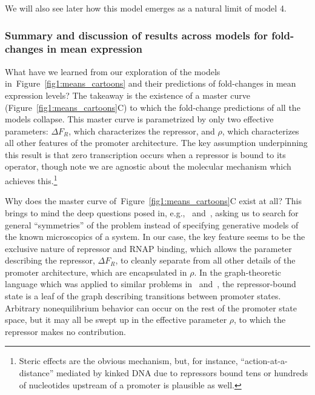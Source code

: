 \documentclass[12pt]{article}%
\newcommand{\fig}[1]{Figure~\ref{#1}}
\begin{document}
We will also see later how this model emerges as a natural limit of model 4.

\subsubsection{Summary and discussion of results across models for fold-changes in mean expression}
What have we learned from our exploration of the models
in~\fig{fig1:means_cartoons} and their predictions of
fold-changes in mean expression levels? The takeaway is the
existence of a master curve (\fig{fig1:means_cartoons}C) to which
the fold-change predictions of all the models collapse. This
master curve is parametrized by only two effective parameters:
$\Delta F_R$, which characterizes the repressor, and $\rho$,
which characterizes all other features of the promoter
architecture. The key assumption underpinning this result is that
zero transcription occurs when a repressor is bound to its
operator, though note we are agnostic about the molecular
mechanism which achieves this.\footnote{
Steric effects are the obvious mechanism, but, for instance,
``action-at-a-distance'' mediated by kinked DNA due to
repressors bound tens or hundreds of nucleotides upstream of a
promoter is plausible as well.}

Why does the master curve of~\fig{fig1:means_cartoons}C exist at all?
This brings to mind the deep questions posed in,
e.g.,~\cite{Frank2013} and~\cite{Frank2014a}, asking us to search
for general ``symmetries'' of the problem instead of specifying
generative models of the known microscopics of a system.
In our case, the key feature seems to be the exclusive nature of
repressor and RNAP binding, which allows the parameter describing
the repressor, $\Delta F_R$, to cleanly separate from all other
details of the promoter architecture, which are encapsulated in $\rho$.
In the graph-theoretic language which was applied to similar
problems in~\cite{Gunawardena2012} and~\cite{Ahsendorf2014}, the
repressor-bound state is a leaf of the graph describing
transitions between promoter states. Arbitrary nonequilibrium
behavior can occur on the rest of the promoter state space, but
it may all be swept up in the effective parameter $\rho$, to
which the repressor makes no contribution.
\end{document}
